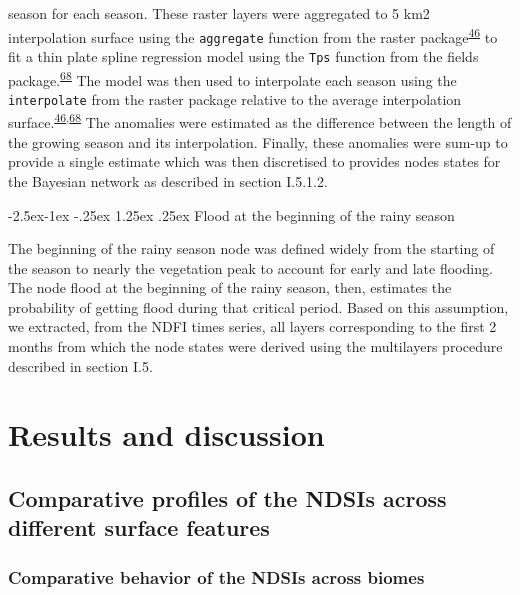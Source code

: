 \documentclass[12pt,oneside]{article}
\makeatletter
\renewcommand\paragraph{\@startsection{paragraph}{4}{\z@}%
            {-2.5ex\@plus -1ex \@minus -.25ex}%
            {1.25ex \@plus .25ex}%
            {\normalfont\normalsize\bfseries}}
\makeatother
\begin{document}
season for each season. These raster layers were aggregated to 5 km2
interpolation surface using the \texttt{aggregate} function from the
raster package\textsuperscript{\protect\hyperlink{ref-Hijmans_2019}{46}}
to fit a thin plate spline regression model using the \texttt{Tps}
function from the fields
package.\textsuperscript{\protect\hyperlink{ref-Nychka_et_al_2018}{68}}
The model was then used to interpolate each season using the
\texttt{interpolate} from the raster package relative to the average
interpolation
surface.\textsuperscript{\protect\hyperlink{ref-Hijmans_2019}{46},\protect\hyperlink{ref-Nychka_et_al_2018}{68}}
The anomalies were estimated as the difference between the length of the
growing season and its interpolation. Finally, these anomalies were
sum-up to provide a single estimate which was then discretised to
provides nodes states for the Bayesian network as described in section
I.5.1.2.

\hypertarget{I.5.2.9}{%
\paragraph{Flood at the beginning of the rainy season}\label{I.5.2.9}}

The beginning of the rainy season node was defined widely from the
starting of the season to nearly the vegetation peak to account for
early and late flooding. The node flood at the beginning of the rainy
season, then, estimates the probability of getting flood during that
critical period. Based on this assumption, we extracted, from the NDFI
times series, all layers corresponding to the first 2 months from which
the node states were derived using the multilayers procedure described
in section I.5.

\hypertarget{II}{%
\section{Results and discussion}\label{II}}

\hypertarget{II.1}{%
\subsection{Comparative profiles of the NDSIs across different surface
features}\label{II.1}}

\hypertarget{II.1.1}{%
\subsubsection{Comparative behavior of the NDSIs across
biomes}\label{II.1.1}}
\end{document}
